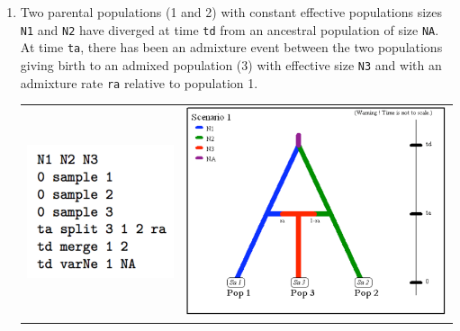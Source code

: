 \begin{enumerate}
\item Two parental populations (1 and 2) with constant effective populations sizes
\texttt{N1} and \texttt{N2} have diverged at time \texttt{td} from
an ancestral population of size \texttt{NA}. At time \texttt{ta},
there has been an admixture event between the two populations giving
birth to an admixed population (3) with effective size \texttt{N3}
and with an admixture rate \texttt{ra} relative to population 1.\\
\begin{center} 
\begin{tabular}{cc}
\includegraphics[scale=0.5]{code_scenario_03.pdf} & \includegraphics[scale=0.35]{scenario_03.pdf} \\
\end{tabular}
\end{center}


\end{enumerate}
